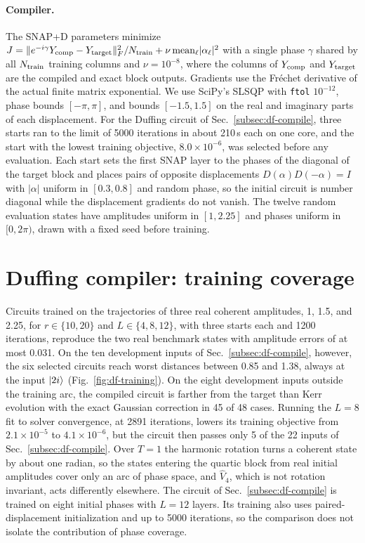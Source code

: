 \documentclass[pra,twocolumn,superscriptaddress,nofootinbib,floatfix]{revtex4-2}
\theoremstyle{remark}
\newcommand{\revcolor}{\color{blue}}
\DeclareRobustCommand{\rev}[1]{{\revcolor #1}}
\begin{document}
\paragraph{\rev{Compiler.}}
\rev{The SNAP+D parameters minimize \(J=\|e^{-i\gamma}Y_{\rm comp}-Y_{\rm target}\|_F^2/N_{\rm train}+\nu\,{\rm mean}_\ell|\alpha_\ell|^2\) with a single phase \(\gamma\) shared by all \(N_{\rm train}\) training columns and \(\nu=10^{-8}\), where the columns of \(Y_{\rm comp}\) and \(Y_{\rm target}\) are the compiled and exact block outputs.} \rev{Gradients use the Fr\'echet derivative of the actual finite matrix exponential.} \rev{We use SciPy's SLSQP with \texttt{ftol} \(10^{-12}\), phase bounds \([-\pi,\pi]\), and bounds \([-1.5,1.5]\) on the real and imaginary parts of each displacement.} \rev{For the Duffing circuit of Sec.~\ref{subsec:df-compile}, three starts ran to the limit of 5000 iterations in about 210\,s each on one core, and the start with the lowest training objective, \(8.0\times10^{-6}\), was selected before any evaluation.} \rev{Each start sets the first SNAP layer to the phases of the diagonal of the target block and places pairs of opposite displacements \(D(\alpha)D(-\alpha)=I\) with \(|\alpha|\) uniform in \([0.3,0.8]\) and random phase, so the initial circuit is number diagonal while the displacement gradients do not vanish.} \rev{The twelve random evaluation states have amplitudes uniform in \([1,2.25]\) and phases uniform in \([0,2\pi)\), drawn with a fixed seed before training.}

\section{\rev{Duffing compiler: training coverage}}
\label{app:duffing-training}

\rev{Circuits trained on the trajectories of three real coherent amplitudes, 1, 1.5, and 2.25, for \(r\in\{10,20\}\) and \(L\in\{4,8,12\}\), with three starts each and 1200 iterations, reproduce the two real benchmark states with amplitude errors of at most 0.031.} \rev{On the ten development inputs of Sec.~\ref{subsec:df-compile}, however, the six selected circuits reach worst distances between 0.85 and 1.38, always at the input \(\ket{2i}\) (Fig.~\ref{fig:df-training}).} \rev{On the eight development inputs outside the training arc, the compiled circuit is farther from the target than Kerr evolution with the exact Gaussian correction in 45 of 48 cases.} \rev{Running the \(L=8\) fit to solver convergence, at 2891 iterations, lowers its training objective from \(2.1\times10^{-5}\) to \(4.1\times10^{-6}\), but the circuit then passes only 5 of the 22 inputs of Sec.~\ref{subsec:df-compile}.} \rev{Over \(T=1\) the harmonic rotation turns a coherent state by about one radian, so the states entering the quartic block from real initial amplitudes cover only an arc of phase space, and \(\hat V_4\), which is not rotation invariant, acts differently elsewhere.} \rev{The circuit of Sec.~\ref{subsec:df-compile} is trained on eight initial phases with \(L=12\) layers.} \rev{Its training also uses paired-displacement initialization and up to 5000 iterations, so the comparison does not isolate the contribution of phase coverage.}
\end{document}
